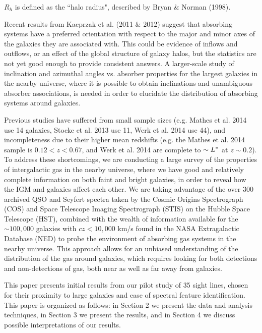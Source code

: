 \documentclass[iop]{emulateapj-rtx4}
\begin{document}
$R_h$ is defined as the ``halo radius", described by Bryan \& Norman (1998). 

Recent results from Kacprzak et al. (2011 $\&$ 2012) suggest that absorbing systems have a preferred orientation with respect to the major and minor axes of the galaxies they are associated with. This could be evidence of inflows and outflows, or an effect of the global structure of galaxy halos, but the statistics are not yet good enough to provide consistent answers. A larger-scale study of inclination and azimuthal angles vs. absorber properties for the largest galaxies in the nearby universe, where it is possible to obtain inclinations and unambiguous absorber associations, is needed in order to elucidate the distribution of absorbing systems around galaxies.


Previous studies have suffered from small sample sizes (e.g. Mathes et al. 2014 use 14 galaxies, Stocke et al. 2013 use 11, Werk et al. 2014 use 44), and incompleteness due to their higher mean redshifts (e.g. the Mathes et al. 2014 sample is $0.12 <z<0.67$, and Werk et al. 2014 are complete to $\sim L^{\**}$ at $z\sim0.2$). To address these shortcomings, we are conducting a large survey of the properties of intergalactic gas in the nearby universe, where we have good and relatively complete information on both faint and bright galaxies, in order to reveal how the IGM and galaxies affect each other. We are taking advantage of the over 300 archived QSO and Seyfert spectra taken by the Cosmic Origins Spectrograph (COS) and Space Telescope Imaging Spectrograph (STIS) on the Hubble Space Telescope (HST), combined with the wealth of information available for the $\sim100,000$ galaxies with $cz<10,000$ km/s found in the NASA Extragalactic Database (NED) to probe the environment of absorbing gas systems in the nearby universe. This approach allows for an unbiased understanding of the distribution of the gas around galaxies, which requires looking for both detections and non-detections of gas, both near as well as far away from galaxies.

This paper presents initial results from our pilot study of 35 sight lines, chosen for their proximity to large galaxies and ease of spectral feature identification. This paper is organized as follows: in Section 2 we present the data and analysis techniques, in Section 3 we present the results, and in Section 4 we discuss possible interpretations of our results.

\end{document}
